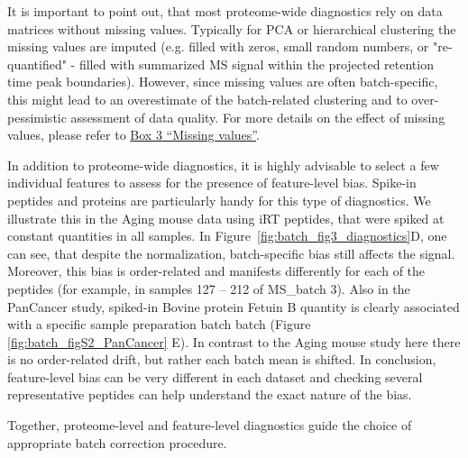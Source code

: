 \documentclass[num-refs]{wiley-article}
\begin{document}
It is important to point out, that most proteome-wide diagnostics rely on data matrices without missing values. Typically for PCA or hierarchical clustering the missing values are imputed (e.g. filled with zeros, small random numbers, or "re-quantified" - filled with summarized MS signal within the projected retention time peak boundaries). However, since missing values are often batch-specific, this might lead to an overestimate of the batch-related clustering and to over-pessimistic assessment of data quality. For more details on the effect of missing values, please refer to \hyperref[box:Box3_missingness]{Box 3 “Missing values”}.

In addition to proteome-wide diagnostics, it is highly advisable to select a few individual features to assess for the presence of feature-level bias. Spike-in peptides and proteins are particularly handy for this type of diagnostics. We illustrate this in the Aging mouse data using iRT peptides, that were spiked at constant quantities in all samples. In Figure~\ref{fig:batch_fig3_diagnostics}D, one can see, that despite the normalization, batch-specific bias still affects the signal. Moreover, this bias is order-related and manifests differently for each of the peptides (for example, in samples 127 – 212 of MS\_batch 3). Also in the PanCancer study, spiked-in Bovine protein Fetuin B quantity is clearly associated with a specific sample preparation batch batch (Figure \ref{fig:batch_figS2_PanCancer} {E}). In contrast to the Aging mouse study here there is no order-related drift, but rather each batch mean is shifted. In conclusion, feature-level bias can be very different in each dataset and checking several representative peptides can help understand the exact nature of the bias.

Together, proteome-level and feature-level diagnostics guide the choice of appropriate batch correction procedure.
\end{document}
